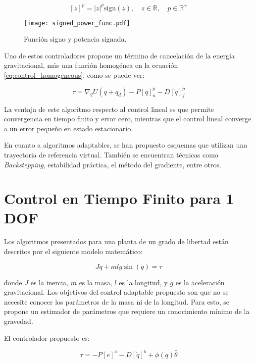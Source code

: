 \documentclass[conference]{IEEEtran}
\begin{document}
\begin{equation} \label{eq:sign_function}
	[z]^p = |z|^p \text{sign}(z), \quad z \in \mathbb{R}, \quad p \in \mathbb{R}^+
\end{equation}

\begin{figure}[htbp]
	\centerline{\texttt{[image: signed\_power\_func.pdf]}}
	\caption{Función signo y potencia signada.}
	\label{fig:sign_function}
\end{figure}

Uno de estos controladores propone un término de cancelación de la energía gravitacional, más una función homogénea en la ecuación \eqref{eq:control_homogeneous}, como se puede ver:

\begin{equation} \label{eq:control_homogeneous}
	\tau = \nabla_q U(q + q_d) - P[q]^p_u - D[\dot{q}]^p_f
\end{equation}

La ventaja de este algoritmo respecto al control lineal es que permite convergencia en tiempo finito y error cero, mientras que el control lineal converge a un error pequeño en estado estacionario.

En cuanto a algoritmos adaptables, se han propuesto esquemas que utilizan una trayectoria de referencia virtual. También se encuentran técnicas como \textit{Backstepping}, estabilidad práctica, el método del gradiente, entre otros.

\section{Control en Tiempo Finito para 1 DOF}

Los algoritmos presentados para una planta de un grado de libertad están descritos por el siguiente modelo matemático:

\begin{equation}
	J \ddot{q} + mlg \sin(q) = \tau
\end{equation}

donde $J$ es la inercia, $m$ es la masa, $l$ es la longitud, y $g$ es la aceleración gravitacional. Los objetivos del control adaptable propuesto son que no se necesite conocer los parámetros de la masa ni de la longitud. Para esto, se propone un estimador de parámetros que requiere un conocimiento mínimo de la gravedad.

El controlador propuesto es:

\begin{equation}
	\tau = -P [e]^a - D[\dot{q}]^b + \phi(q) \hat{\theta}
\end{equation}
\end{document}

